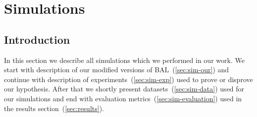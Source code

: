 
\section{Simulations}
\label{sec:simulations} 

\subsection*{Introduction} 
In this section we describe all simulations which we performed in our work. We start with description of our modified versions of BAL~(\ref{sec:sim-our}) and continue with description of experiments~(\ref{sec:sim-exp}) used to prove or disprove our hypothesis. After that we shortly present datasets~(\ref{sec:sim-data}) used for our simulations and end with evaluation metrics~(\ref{sec:sim-evaluation}) used in the results section~(\ref{sec:results}). 

 

 



 
